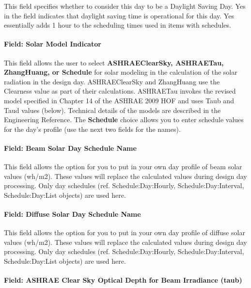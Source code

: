 This field specifies whether to consider this day to be a Daylight Saving Day. Yes in the field indicates that daylight saving time is operational for this day. Yes essentially adds 1 hour to the scheduling times used in items with schedules.

\paragraph{Field: Solar Model Indicator}\label{field-solar-model-indicator}

This field allows the user to select \textbf{ASHRAE\-Clear\-Sky, ASHRAE\-Tau, Zhang\-Huang, or Sche\-dule} for solar modeling in the calculation of the solar radiation in the design day. ASHRAE\-Clear\-Sky and Zhang\-Huang use the Clearness value as part of their calculations. ASHRAE\-Tau invokes the revised model specified in Chapter 14 of the ASHRAE 2009 HOF and uses Taub and Taud values (below). Technical details of the models are described in the Engineering Reference. The \textbf{Schedule} choice allows you to enter schedule values for the day's profile (use the next two fields for the names).

\paragraph{Field: Beam Solar Day Schedule Name}\label{field-beam-solar-day-schedule-name}

This field allows the option for you to put in your own day profile of beam solar values (wh/m2). These values will replace the calculated values during design day processing. Only day schedules (ref. Schedule:Day:Hourly, Schedule:Day:Interval, Schedule:Day:List objects) are used here.

\paragraph{Field: Diffuse Solar Day Schedule Name}\label{field-diffuse-solar-day-schedule-name}

This field allows the option for you to put in your own day profile of diffuse solar values (wh/m2). These values will replace the calculated values during design day processing. Only day schedules (ref. Schedule:Day:Hourly, Schedule:Day:Interval, Schedule:Day:List objects) are used here.

\paragraph{Field: ASHRAE Clear Sky Optical Depth for Beam Irradiance (taub)}\label{field-ashrae-clear-sky-optical-depth-for-beam-irradiance-taub}

